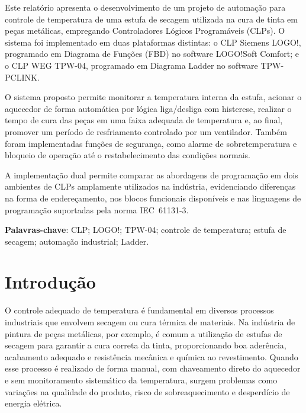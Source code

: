 \documentclass[
  12pt,
  openright,
  oneside,
  a4paper,
  chapter=TITLE,
  section=TITLE,
  brazilian
]{abntex2}
\renewcommand{\imprimircapa}{%
  \begin{capa}%
    \center
    {\ABNTEXchapterfont\large\MakeUppercase{\imprimirinstituicao}\par}
    \vspace*{3cm}
    {\ABNTEXchapterfont\large\imprimirautor\par}
    \vfill
    {\ABNTEXchapterfont\bfseries\Large\MakeUppercase{\imprimirtitulo}\par}
    \vfill
    {\large\imprimirlocal\par}
    {\large\imprimirdata\par}
  \end{capa}%
}
\begin{document}

\pretextual

\imprimircapa
\imprimirfolhaderosto*

\begin{resumo}
Este relat\'{o}rio apresenta o desenvolvimento de um projeto de automa\c{c}\~{a}o para controle de temperatura de uma estufa de secagem utilizada na cura de tinta em pe\c{c}as met\'{a}licas, empregando Controladores L\'{o}gicos Program\'{a}veis (CLPs). O sistema foi implementado em duas plataformas distintas: o CLP Siemens LOGO!, programado em Diagrama de Fun\c{c}\~{o}es (FBD) no software LOGO!Soft Comfort; e o CLP WEG TPW-04, programado em Diagrama Ladder no software TPW-PCLINK.

O sistema proposto permite monitorar a temperatura interna da estufa, acionar o aquecedor de forma autom\'{a}tica por l\'{o}gica liga/desliga com histerese, realizar o tempo de cura das pe\c{c}as em uma faixa adequada de temperatura e, ao final, promover um per\'{i}odo de resfriamento controlado por um ventilador. Tamb\'{e}m foram implementadas fun\c{c}\~{o}es de seguran\c{c}a, como alarme de sobretemperatura e bloqueio de opera\c{c}\~{a}o at\'{e} o restabelecimento das condi\c{c}\~{o}es normais.

A implementa\c{c}\~{a}o dual permite comparar as abordagens de programa\c{c}\~{a}o em dois ambientes de CLPs amplamente utilizados na ind\'{u}stria, evidenciando diferen\c{c}as na forma de endere\c{c}amento, nos blocos funcionais dispon\'{i}veis e nas linguagens de programa\c{c}\~{a}o suportadas pela norma IEC~61131-3.

\textbf{Palavras-chave}: CLP; LOGO!; TPW-04; controle de temperatura; estufa de secagem; automa\c{c}\~{a}o industrial; Ladder.

\end{resumo}

\tableofcontents

\textual

\chapter{Introdu\c{c}\~{a}o}

O controle adequado de temperatura \'{e} fundamental em diversos processos industriais que envolvem secagem ou cura t\'{e}rmica de materiais. Na ind\'{u}stria de pintura de pe\c{c}as met\'{a}licas, por exemplo, \'{e} comum a utiliza\c{c}\~{a}o de estufas de secagem para garantir a cura correta da tinta, proporcionando boa ader\^{e}ncia, acabamento adequado e resist\^{e}ncia mec\^{a}nica e qu\'{i}mica ao revestimento. Quando esse processo \'{e} realizado de forma manual, com chaveamento direto do aquecedor e sem monitoramento sistem\'{a}tico da temperatura, surgem problemas como varia\c{c}\~{o}es na qualidade do produto, risco de sobreaquecimento e desperd\'{i}cio de energia el\'{e}trica.
\end{document}
